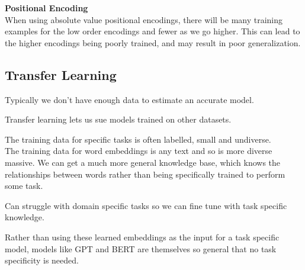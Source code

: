 \documentclass[8pt]{extarticle} %
\begin{document}
\begin{multicols*}{3}
\textbf{Positional Encoding}\\
When using absolute value positional encodings, there will be many training examples for the low order encodings and fewer as we go higher. This can lead to the higher encodings being poorly trained, and may result in poor generalization.
\subsection*{Transfer Learning}
Typically we don't have enough data to estimate an accurate model.

Transfer learning lets us sue models trained on other datasets. 

The training data for specific tasks is often labelled, small and undiverse. \\
The training data for word embeddings is any text and so is more diverse massive. 
We can get a much more general knowledge base, which knows the relationships between words 
rather than being specifically trained to perform some task.

Can struggle with domain specific tasks so we can fine tune with task specific knowledge.

Rather than using these learned embeddings as the input for a task specific model, models like GPT and BERT are themselves so general that no task specificity is needed.

\end{multicols*}
\end{document}
